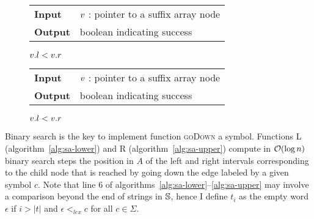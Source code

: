 \begin{figure*}[t!]
\begin{minipage}[t]{.5\textwidth}
\begin{algorithm}[H]
\begin{tabular}{ll}
\textbf{Input}  & $v$ : pointer to a suffix array node\\
\textbf{Output} & boolean indicating success\\
\end{tabular}
\begin{algorithmic}[1]
	\State \Return \False
\EndIf
{}
{}
\EndIf
\State \Return $v.l < v.r$
\end{algorithmic}
\label{alg:sa-godown}
\end{algorithm}
\end{minipage}
\hfill
\begin{minipage}[t]{.5\textwidth}
\begin{algorithm}[H]
\begin{tabular}{ll}
\textbf{Input}  & $v$ : pointer to a suffix array node\\
\textbf{Output} & boolean indicating success\\
\end{tabular}
\begin{algorithmic}[1]
	\State \Return \False
\EndIf
{}
\EndIf
\State \Return $v.l < v.r$
\item[]
\end{algorithmic}
\label{alg:sa-goright}
\end{algorithm}
\end{minipage}
\end{figure*}

Binary search is the key to implement function \textsc{goDown} a symbol.
Functions \textsc{L} (algorithm~\ref{alg:sa-lower}) and \textsc{R} (algorithm~\ref{alg:sa-upper}) compute in $\mathcal{O}(\log{n})$ binary search steps the position in $A$ of the left and right intervals corresponding to the child node that is reached by going down the edge labeled by a given symbol $c$.
Note that line 6 of algorithms~\ref{alg:sa-lower}--\ref{alg:sa-upper} may involve a comparison beyond the end of strings in $\mathbb{S}$, hence I define $t_i$ as the empty word $\epsilon$ if $i > |t|$ and $\epsilon <_{lex} c$ for all $c \in \Sigma$.

